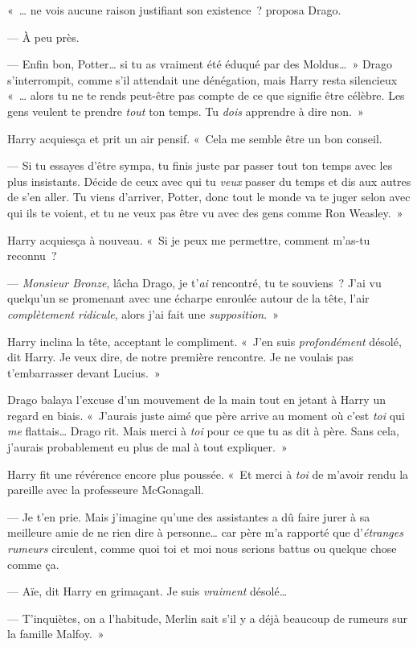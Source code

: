 «~… ne vois aucune raison justifiant son existence~? proposa Drago.

--- À peu près.

--- Enfin bon, Potter… si tu as vraiment été éduqué par des Moldus…~» Drago s'interrompit, comme s'il attendait une dénégation, mais Harry resta silencieux «~… alors tu ne te rends peut-être pas compte de ce que signifie être célèbre.
Les gens veulent te prendre \emph{tout} ton temps.
Tu \emph{dois} apprendre à dire non.~»

Harry acquiesça et prit un air pensif.  «~Cela me semble être un bon conseil.

--- Si tu essayes d'être sympa, tu finis juste par passer tout ton temps avec les plus insistants.
Décide de ceux avec qui tu \emph{veux} passer du temps et dis aux autres de s'en aller.
Tu viens d'arriver, Potter, donc tout le monde va te juger selon avec qui ils te voient, et tu ne veux pas être vu avec des gens comme Ron Weasley.~»

Harry acquiesça à nouveau.  «~Si je peux me permettre, comment m'as-tu reconnu~?

--- \emph{Monsieur Bronze}, lâcha Drago, je t'\emph{ai} rencontré, tu te souviens~?
J'ai vu quelqu'un se promenant avec une écharpe enroulée autour de la tête, l'air \emph{complètement ridicule}, alors j'ai fait une \emph{supposition}.~»

Harry inclina la tête, acceptant le compliment. «~J'en suis \emph{profondément} désolé, dit Harry.
Je veux dire, de notre première rencontre. Je ne voulais pas t'embarrasser devant Lucius.~»

Drago balaya l'excuse d'un mouvement de la main tout en jetant à Harry un regard en biais.
«~J'aurais juste aimé que père arrive au moment où c'est \emph{toi} qui \emph{me} flattais… Drago rit.
Mais merci à \emph{toi} pour ce que tu as dit à père.
Sans cela, j'aurais probablement eu plus de mal à tout expliquer.~»

Harry fit une révérence encore plus poussée.  «~Et merci à \emph{toi} de m'avoir rendu la pareille avec la professeure McGonagall.

--- Je t'en prie.
Mais j'imagine qu'une des assistantes a dû faire jurer à sa meilleure amie de ne rien dire à personne… car père m'a rapporté que d'\emph{étranges rumeurs} circulent, comme quoi toi et moi nous serions battus ou quelque chose comme ça.

--- Aïe, dit Harry en grimaçant. Je suis \emph{vraiment} désolé…

--- T'inquiètes, on a l'habitude, Merlin sait s'il y a déjà beaucoup de rumeurs sur la famille Malfoy.~»

